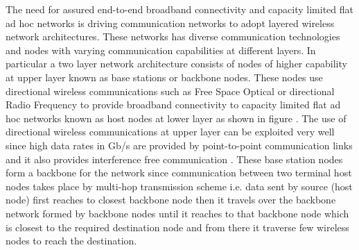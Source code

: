 \documentclass[11pt]{article}
\numberwithin{equation}{section}
\begin{document}
The need for assured end-to-end broadband connectivity and capacity limited flat ad hoc networks is driving communication networks to adopt layered wireless network architectures. These networks has diverse communication technologies and nodes with varying communication capabilities at different layers. In particular a two layer network architecture consists of nodes of higher capability at upper layer known as base stations or backbone nodes. These nodes use directional wireless communications such as Free Space Optical or directional Radio Frequency to provide broadband connectivity to capacity limited flat ad hoc networks known as host nodes at lower layer as shown in figure . The use of directional wireless communications at upper layer can be exploited very well since high data rates in Gb/s are provided by point-to-point communication links and it also provides interference free communication \cite{dh,sd,sl}. These base station nodes form a backbone for the network since communication between two terminal host nodes takes place by multi-hop transmission scheme i.e. data sent by source (host node) first reaches to closest backbone node then it travels over the backbone network formed by backbone nodes until it reaches to that backbone node which is closest to the required destination node and from there it traverse few wireless nodes to reach the destination. \\
\end{document}
